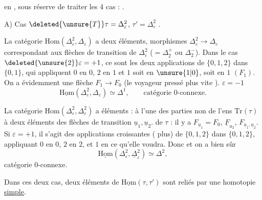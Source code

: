 
en , sous réserve de traiter les 4 cas : .

A) Cas $\deleted{\unsure{T}}\tau=\Delta_{\varepsilon}^{2}$, $\tau'=\Delta_{\varepsilon}^{2}$ . 

La catégorie $\mathrm{Hom}(\Delta_{\varepsilon}^{2},\Delta_{\varepsilon})$ a deux éléments,  morphismes $\Delta_{\varepsilon}^{2}\longrightarrow\Delta_{\varepsilon}$ correspondant aux  flèches de transition de $\Delta_{\varepsilon}^{2}$ ($=\mathbb{\Delta}_{2}^{+}$ ou $\mathbb{\Delta}_{2}^{-}$). Dans le cas $\deleted{\unsure{2}}\varepsilon=+1$, ce sont les deux applications
de $\{0,1,2\}$ dans $\{0,1\}$, qui appliquent $0$ en $0$, $2$ en $1$ et $1$ soit en $\unsure{1|0}$,   soit en $1$ $(F_1)$. On a évidemment une flèche $F_1\longrightarrow F_0$ (le voyageur pressé  plus vite ).    $\varepsilon=-1$
\[
\underline{\mathrm{Hom}}(\Delta_{\varepsilon}^{2},\Delta_{\varepsilon})\simeq\mathbb{\Delta}^{1},\qquad \text{catégorie 0-connexe.}
\]

La catégorie $\mathrm{Hom}(\Delta_{\varepsilon}^{2},\Delta_{\varepsilon}^{2})$ a  éléments :   à l'une des parties non  de l'ens $\mathrm{Tr}(\tau)$ à deux éléments des flèches de transition $\underline u_1,\underline u_2$. de $\tau$ : il y a $F_{\underline u_1}=F_0$, $\underline F_{u_2}$, $F_{\underline u_1,\underline u_2}$. Si $\varepsilon=+1$, il s'agit des applications croissantes ( plus) de $\{0,1,2\}$ dans $\{0,1,2\}$, appliquant $0$  en $0$, $2$ en $2$, et $1$ en ce qu'elle voudra. Donc
et on a bien sûr
\[
\underline{\mathrm{Hom}}(\Delta_{\varepsilon}^{2},\underline{\Delta}_{\varepsilon}^{2})\simeq\mathbb{\Delta}^{2},
\]
catégorie 0-connexe.

Dans ces deux cas, deux éléments de $\underline{\mathrm{Hom}}(\tau,\tau')$ sont reliés par une homotopie \uline{simple}.

